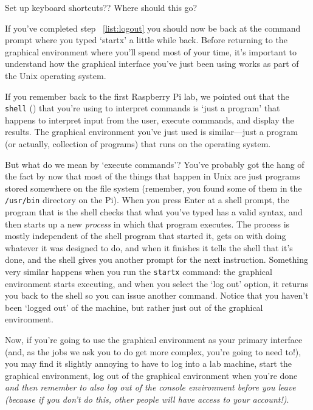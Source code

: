 \begin{note}
Set up keyboard shortcuts?? Where should this go?
\end{note}

If you've completed step ~\ref{list:logout} you should now be back at the command prompt where you typed `startx' a little while back. Before returning to the graphical environment where you'll spend most of your time, it's important to understand how the graphical interface you've just been using works as part of the Unix operating system. 

If you remember back to the first Raspberry Pi lab, we pointed out that the \texttt{shell} () that you're using to interpret commands is `just a program' that happens to interpret input from the user, execute commands, and display the results. The graphical environment you've just used is similar---just a program (or actually, collection of programs) that runs on the operating system.

But what do we mean by `execute commands'? You've probably got the hang of the fact by now that most of the things that happen in Unix are just programs stored somewhere on the file system (remember, you found some of them in the \texttt{/usr/bin} directory on the Pi). When you press Enter at a shell prompt, the program that is the shell checks that what you've typed has a valid syntax, and then starts up a new \textit{process} in which that program executes. The process is mostly independent of the shell program that started it, gets on with doing whatever it was designed to do, and when it finishes it tells the shell that it's done, and the shell gives you another prompt for the next instruction. Something very similar happens when you run the \texttt{startx} command: the graphical environment starts executing, and when you select the `log out' option, it returns you back to the shell so you can issue another command. Notice that you haven't been `logged out' of the machine, but rather just out of the graphical environment. 

Now, if you're going to use the graphical environment as your primary interface (and, as the jobs we ask you to do get more complex, you're going to need to!), you may find it slightly annoying to have to log into a lab machine, start the graphical environment, log out of the graphical environment when you're done \textit{and then remember to also log out of the console environment before you leave (because if you don't do this, other people will have access to your account!)}. 

